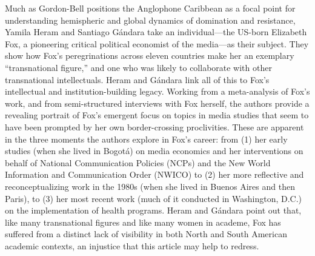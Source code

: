 \documentclass{tufte-handout}
\begin{document}
Much as Gordon-Bell positions the Anglophone Caribbean as a focal point
for understanding hemispheric and global dynamics of domination and
resistance, Yamila Heram and Santiago Gándara take an individual---the
US-born Elizabeth Fox, a pioneering critical political economist of the
media---as their subject. They show how Fox's peregrinations across
eleven countries make her an exemplary ``transnational figure,'' and one
who was likely to collaborate with other transnational intellectuals.
Heram and Gándara link all of this to Fox's intellectual and
institution-building legacy. Working from a meta-analysis of Fox's work,
and from semi-structured interviews with Fox herself, the authors
provide a revealing portrait of Fox's emergent focus on topics in media
studies that seem to have been prompted by her own border-crossing
proclivities. These are apparent in the three moments the authors
explore in Fox's career: from (1) her early studies (when she lived in
Bogotá) on media economics and her interventions on behalf of National
Communication Policies (NCPs) and the New World Information and
Communication Order (NWICO) to (2) her more reflective and
reconceptualizing work in the 1980s (when she lived in Buenos Aires and
then Paris), to (3) her most recent work (much of it conducted in
Washington, D.C.) on the implementation of health programs. Heram and
Gándara point out that, like many transnational figures and like many
women in academe, Fox has suffered from a distinct lack of visibility in
both North and South American academic contexts, an injustice that this
article may help to redress.
\end{document}
